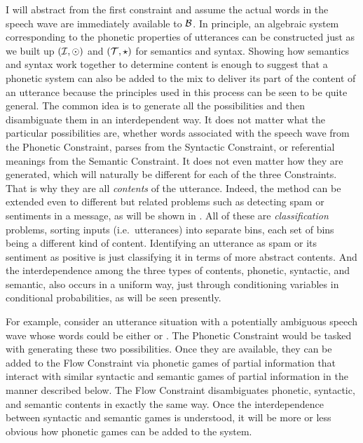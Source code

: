 I will abstract from the first constraint and assume the actual words in the speech wave are immediately available to $\cal B$. In principle, an algebraic system corresponding to the phonetic properties of utterances can be constructed just as we built up $({\cal I}, \odot)$ and $({\cal T}, \star)$ for semantics and syntax. Showing how semantics and syntax work together to determine content is enough to suggest that a phonetic system can also be added to the mix to deliver its part of the content of an utterance because the principles used in this process can be seen to be quite general. The common idea is to generate all the possibilities and then disambiguate them in an interdependent way. It does not matter what the particular possibilities are, whether words associated with the speech wave from the Phonetic Constraint, parses from the Syntactic Constraint, or referential meanings from the Semantic Constraint. It does not even matter how they are generated, which will naturally be different for each of the three Constraints. That is why they are all \emph{contents} of the utterance. Indeed, the method can be extended even to different but related problems such as detecting spam or sentiments in a message, as will be shown in . All of these are \emph{classification} problems, sorting inputs (i.e.\ utterances) into separate bins, each set of bins being a different kind of content. Identifying an utterance as spam or its sentiment as positive is just classifying it in terms of more abstract contents. And the interdependence among the three types of contents, phonetic, syntactic, and semantic, also occurs in a uniform way, just through conditioning variables in conditional probabilities, as will be seen presently.

For example, consider an utterance situation with a potentially ambiguous speech wave whose words could be either  or . The Phonetic Constraint would be tasked with generating these two possibilities. Once they are available, they can be added to the Flow Constraint via phonetic games of partial information that interact with similar syntactic and semantic games of partial information in the manner described below. The Flow Constraint disambiguates phonetic, syntactic, and semantic contents in exactly the same way. Once the interdependence between syntactic and semantic games is understood, it will be more or less obvious how phonetic games can be added to the system. 


